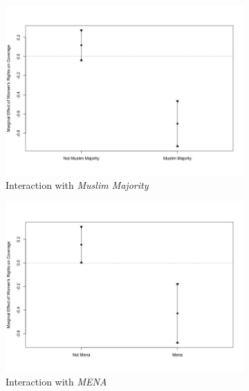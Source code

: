 \documentclass[11pt, oneside]{article}
\begin{document}
\begin{figure}
\begin{subfigure}{.5\textwidth}
  \centering
  \includegraphics[width=1\linewidth]{nb1}
  \caption{Interaction with \emph{Muslim Majority}}
  \label{fig:sfig1}
\end{subfigure} 
\begin{subfigure}{.5\textwidth}
  \centering
  \includegraphics[width=1\linewidth]{nb2}
    \caption{Interaction with \emph{MENA}}
  \label{fig:sfig2}
\end{subfigure}
\begin{subfigure}{.5\textwidth}
\vspace{.5cm}
  \centering

\end{subfigure}
\end{figure}
\end{document}
